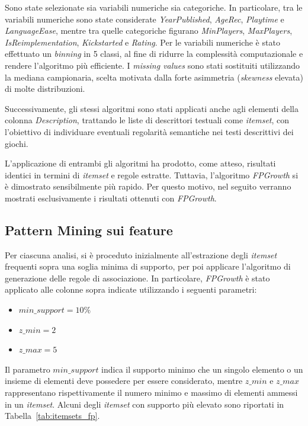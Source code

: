 \documentclass[10pt,twocolumn]{article}
\begin{document}
Sono state selezionate sia variabili numeriche sia categoriche. In particolare, tra le variabili numeriche sono state considerate \textit{YearPublished}, \textit{AgeRec}, \textit{Playtime} e \textit{LanguageEase}, mentre tra quelle categoriche figurano \textit{MinPlayers}, \textit{MaxPlayers}, \textit{IsReimplementation}, \textit{Kickstarted} e \textit{Rating}. Per le variabili numeriche è stato effettuato un \textit{binning} in 5 classi, al fine di ridurre la complessità computazionale e rendere l’algoritmo più efficiente. I \textit{missing values} sono stati sostituiti utilizzando la mediana campionaria, scelta motivata dalla forte asimmetria (\textit{skewness} elevata) di molte distribuzioni.

Successivamente, gli stessi algoritmi sono stati applicati anche agli elementi della colonna \textit{Description}, trattando le liste di descrittori testuali come \textit{itemset}, con l’obiettivo di individuare eventuali regolarità semantiche nei testi descrittivi dei giochi.

L’applicazione di entrambi gli algoritmi ha prodotto, come atteso, risultati identici in termini di \textit{itemset} e regole estratte. Tuttavia, l’algoritmo \textit{FPGrowth} si è dimostrato sensibilmente più rapido. Per questo motivo, nel seguito verranno mostrati esclusivamente i risultati ottenuti con \textit{FPGrowth}.

\subsection{Pattern Mining sui feature}

Per ciascuna analisi, si è proceduto inizialmente all’estrazione degli \textit{itemset} frequenti sopra una soglia minima di supporto, per poi applicare l’algoritmo di generazione delle regole di associazione. In particolare, \textit{FPGrowth} è stato applicato alle colonne sopra indicate utilizzando i seguenti parametri:

\begin{itemize}
\item $min\_support = 10\%$
\item $z\_min = 2$
\item $z\_max = 5$
\end{itemize}

Il parametro \textit{$min\_support$} indica il supporto minimo che un singolo elemento o un insieme di elementi deve possedere per essere considerato, mentre $z\_min$ e $z\_max$ rappresentano rispettivamente il numero minimo e massimo di elementi ammessi in un \textit{itemset}. Alcuni degli \textit{itemset} con supporto più elevato sono riportati in Tabella~\ref{tab:itemsets_fp}.
\end{document}
